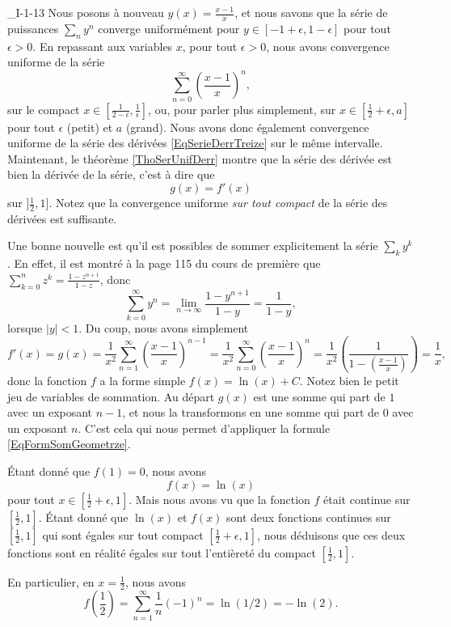 \begin{corrige}{_I-1-13}
Nous posons à nouveau $y(x)=\frac{ x-1 }{ x }$, et nous savons que la série de puissances $\sum_ny^n$ converge uniformément pour $y\in[-1+\epsilon,1-\epsilon]$ pour tout $\epsilon>0$. En repassant aux variables $x$, pour tout $\epsilon>0$, nous avons convergence uniforme de la série 
\begin{equation}
	\sum_{n=0}^{\infty} \left( \frac{ x-1 }{ x } \right)^n, 
\end{equation}
sur le compact $x\in[\frac{ 1 }{ 2-\epsilon },\frac{1}{ \epsilon }]$, ou, pour parler plus simplement, sur $x\in[\frac{ 1 }{2}+\epsilon,a]$ pour tout $\epsilon$ (petit) et $a$ (grand). Nous avons donc également convergence uniforme de la série des dérivées \eqref{EqSerieDerrTreize} sur le même intervalle. Maintenant, le théorème \ref{ThoSerUnifDerr} montre que la série des dérivée est bien la dérivée de la série, c'est à dire que 
\begin{equation}
	g(x)=f'(x)
\end{equation}
sur $]\frac{ 1 }{ 2 },1]$. Notez que la convergence uniforme \emph{sur tout compact} de la série des dérivées est suffisante.

Une bonne nouvelle est qu'il est possibles de sommer explicitement la série $\sum_ky^k$. En effet, il est montré à la page 115 du cours de première que $\sum_{k=0}^n z^k=\frac{ 1-z^{n+1} }{ 1-z }$, donc
\begin{equation}		\label{EqFormSomGeometrze}
	\sum_{k=0}^{\infty}y^n=\lim_{n\to\infty}\frac{1-y^{n+1}}{ 1-y }=\frac{1}{ 1-y },
\end{equation}
lorsque $| y |<1$. Du coup, nous avons simplement
\begin{equation}
	f'(x)=g(x)=\frac{1}{ x^2 }\sum_{n=1}^{\infty}\left( \frac{ x-1 }{ x } \right)^{n-1}=\frac{1}{ x^2 }\sum_{n=0}^{\infty}\left( \frac{ x-1 }{ x } \right)^n=\frac{1}{ x^2 }\left( \frac{1}{  1-\left( \frac{ x-1 }{ x } \right)  } \right)=\frac{1}{ x },
\end{equation}
donc la fonction $f$ a la forme simple $f(x)=\ln(x)+C$. Notez bien le petit jeu de variables de sommation. Au départ $g(x)$ est une somme qui part de $1$ avec un exposant $n-1$, et nous la transformons en une somme qui part de $0$ avec un exposant $n$. C'est cela qui nous permet d'appliquer la formule \eqref{EqFormSomGeometrze}.

 Étant donné que $f(1)=0$, nous avons
\begin{equation}
	f(x)=\ln(x)
\end{equation}
pour tout $x\in[\frac{ 1 }{2}+\epsilon,1]$. Mais nous avons vu que la fonction $f$ était continue sur $[\frac{ 1 }{2},1]$. Étant donné que $\ln(x)$ et $f(x)$ sont deux fonctions continues sur $[\frac{ 1 }{2},1]$ qui sont égales sur tout compact $[\frac{ 1 }{2}+\epsilon,1]$, nous déduisons que ces deux fonctions sont en réalité égales sur tout l'entièreté du compact $[\frac{ 1 }{2},1]$.

En particulier, en $x=\frac{ 1 }{2}$, nous avons
\begin{equation}
	f(\frac{ 1 }{2})=\sum_{n=1}^{\infty}\frac{1}{ n }(-1)^n=\ln(1/2)=-\ln(2).
\end{equation}
\end{corrige}

